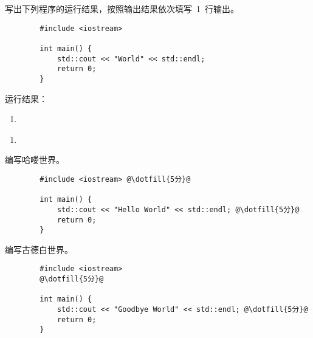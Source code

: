 \documentclass[]{cuzexam}
\begin{document}
\begin{problem}
    写出下列程序的运行结果，按照输出结果依次填写~1~行输出。
    \begin{verbatim}
        #include <iostream>
        
        int main() {
            std::cout << "World" << std::endl;
            return 0;
        }
    \end{verbatim}
    运行结果：
    \begin{enumerate}[label=(\arabic*),resume=cuzafter]
        \item {}
    \end{enumerate}
\end{problem}

\begin{sheetcontents}
    \begin{enumerate}[label=(\arabic*)]
        \item {}
    \end{enumerate}
\end{sheetcontents}


\begin{problem}
    编写哈喽世界。
\end{problem}

\begin{solution}
    \begin{verbatim}
        #include <iostream> @\dotfill{5分}@
        
        int main() {
            std::cout << "Hello World" << std::endl; @\dotfill{5分}@
            return 0;
        }
    \end{verbatim}
\end{solution}

\begin{studentanswer}
    \newpage
\end{studentanswer}

\begin{problem}
    编写古德白世界。
\end{problem}

\begin{solution}
    \begin{verbatim}
        #include <iostream> 
        @\dotfill{5分}@
        
        int main() {
            std::cout << "Goodbye World" << std::endl; @\dotfill{5分}@
            return 0;
        }
    \end{verbatim}
\end{solution}
\end{document}
